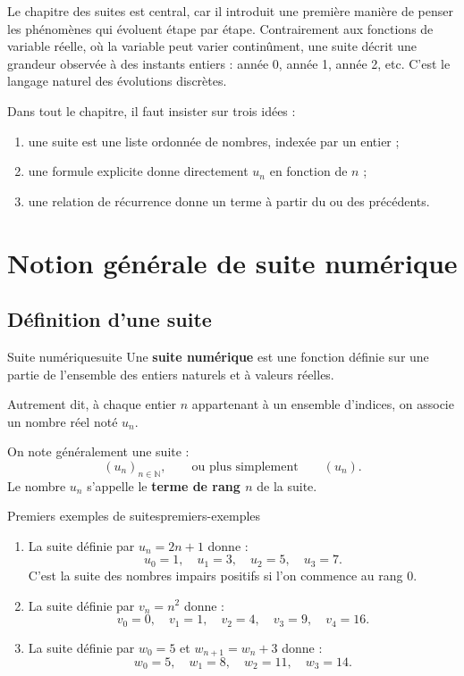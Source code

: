 \documentclass[11pt,a4paper]{article}
\newcommand{\N}{\mathbb{N}}
\begin{document}
Le chapitre des suites est central, car il introduit une première manière de penser les phénomènes qui évoluent étape par étape. Contrairement aux fonctions de variable réelle, où la variable peut varier continûment, une suite décrit une grandeur observée à des instants entiers : année 0, année 1, année 2, etc. C'est le langage naturel des évolutions discrètes.

\begin{rememberbox}
Dans tout le chapitre, il faut insister sur trois idées :
\begin{enumerate}
  \item une suite est une liste ordonnée de nombres, indexée par un entier ;
  \item une formule explicite donne directement $u_n$ en fonction de $n$ ;
  \item une relation de récurrence donne un terme à partir du ou des précédents.
\end{enumerate}
\end{rememberbox}

\section{Notion générale de suite numérique}

\subsection{Définition d'une suite}

\begin{definitionbox}{Suite numérique}{suite}
Une \textbf{suite numérique} est une fonction définie sur une partie de l'ensemble des entiers naturels et à valeurs réelles.

Autrement dit, à chaque entier $n$ appartenant à un ensemble d'indices, on associe un nombre réel noté $u_n$.

On note généralement une suite :
\[
(u_n)_{n\in\N}, \qquad \text{ou plus simplement} \qquad (u_n).
\]
Le nombre $u_n$ s'appelle le \textbf{terme de rang $n$} de la suite.
\end{definitionbox}

\begin{examplebox}{Premiers exemples de suites}{premiers-exemples}
\begin{enumerate}
  \item La suite définie par $u_n=2n+1$ donne :
  \[
  u_0=1,\quad u_1=3,\quad u_2=5,\quad u_3=7.
  \]
  C'est la suite des nombres impairs positifs si l'on commence au rang $0$.

  \item La suite définie par $v_n=n^2$ donne :
  \[
  v_0=0,\quad v_1=1,\quad v_2=4,\quad v_3=9,\quad v_4=16.
  \]

  \item La suite définie par $w_0=5$ et $w_{n+1}=w_n+3$ donne :
  \[
  w_0=5,\quad w_1=8,\quad w_2=11,\quad w_3=14.
  \]
\end{enumerate}
\end{examplebox}
\end{document}
